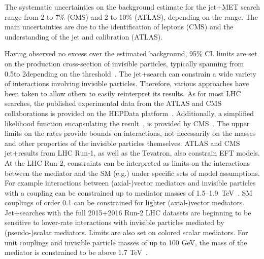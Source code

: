 The systematic uncertainties on the background estimate for the jet+MET search range from 2 to 7\% (CMS) and 2 to 10\% (ATLAS), depending on the \MET range. The main uncertainties are due to the identification of leptons (CMS) and the understanding of the jet and \MET calibration (ATLAS). 


Having observed no excess over the estimated background, 95\% CL limits are set on the production cross-section of invisible particles, typically spanning from 0.5\pb to 2\fb depending on the \MET threshold~\cite{Aaboud:2017phn}. 
The jet+\MET search can constrain a wide variety of interactions involving invisible particles. Therefore, various approaches have been taken to allow others to easily reinterpret its results. 
As for most LHC searches, the published experimental data from the ATLAS and CMS collaborations is provided on the HEPData platform~\cite{Maguire:2017ypu}. 
Additionally, a simplified likelihood function encapsulating the result~\cite{Collaboration:2242860}, is provided by CMS~\cite{Sirunyan:2017jix}.
The upper limits on the rates provide bounds on interactions, not necessarily on the masses and other properties of the invisible particles themselves.
ATLAS and CMS jet+\MET results from LHC Run-1, as well as the Tevatron, also constrain EFT models.  
At the LHC Run-2, constraints can be interpreted as limits on the interactions between the mediator and the SM (e.g.\gq) under specific sets of model assumptions. 
For example interactions between (axial-)vector mediators and invisible particles with a coupling  can be constrained up to mediator masses of 1.5--1.9~TeV~\cite{Aaboud:2017phn,Sirunyan:2017jix}. SM couplings of order 0.1 can be constrained for lighter (axial-)vector mediators. 
Jet+\MET searches with the full 2015+2016 Run-2 LHC datasets are beginning to be sensitive to lower-rate interactions with invisible particles mediated by (pseudo-)scalar mediators. 
Limits are also set on colored scalar mediators. For unit couplings and invisible particle masses of up to 100 GeV, the mass of the mediator is constrained to be above 1.7 TeV~\cite{Aaboud:2017phn}. 

